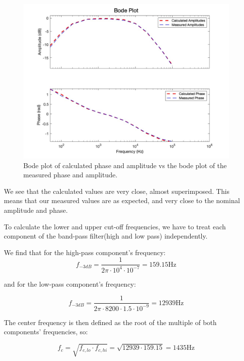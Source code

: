 \begin{figure}[H]
    \centering
    \includegraphics[scale=0.3]{images/bode_plot_bandpass_calculated.jpg}
    \caption{Bode plot of calculated phase and amplitude vs the bode plot of the measured phase and amplitude.}
\end{figure}


We see that the calculated values are very close, almost superimposed. This means that our measured values are as expected, and very close to the nominal amplitude and phase.


To calculate the lower and upper cut-off frequencies, we have to treat each component of the band-pass filter(high and low pass) independently.

We find that for the high-pass component's frequency:
\begin{equation}
    f_{-3dB} = \frac{1}{2\pi \cdot 10^4 \cdot 10^{-7}} = 159.15\text{Hz}
\end{equation}

and for the low-pass component's frequency:

\begin{equation}
    f_{-3dB} = \frac{1}{2\pi \cdot 8200 \cdot 1.5 \cdot 10^{-9}} = 12939\text{Hz}
\end{equation}


The center frequency is then defined as the root of the multiple of both components' frequencies, so:

\begin{equation}
    f_c = \sqrt{f_{c,lo}\cdot f_{c, hi}} = \sqrt{12939 \cdot 159.15} = 1435\text{Hz}
\end{equation}

